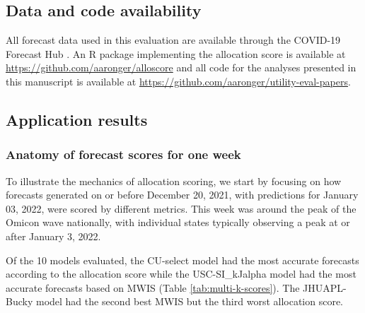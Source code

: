 \documentclass{article}\usepackage[]{graphicx}\usepackage[]{xcolor}
\begin{document}
\subsection{Data and code availability}

All forecast data used in this evaluation are available through the COVID-19 Forecast Hub \citep{cramer_reichlabcovid19-forecast-hub_2021}. An R package implementing the allocation score is available at \url{https://github.com/aaronger/alloscore} and all code for the analyses presented in this manuscript is available at \url{https://github.com/aaronger/utility-eval-papers}.

\subsection{Application results}




\subsubsection{Anatomy of forecast scores for one week}

To illustrate the mechanics of allocation scoring, we start by focusing on how forecasts generated on or before December 20, 2021, with predictions for January 03, 2022, were scored by different metrics.
This week was around the peak of the Omicon wave nationally, with individual states typically observing a peak at or after January 3, 2022.

Of the 10 models evaluated, the CU-select model had the most accurate forecasts according to the allocation score while the USC-SI\_kJalpha model had the most accurate forecasts based on MWIS (Table \ref{tab:multi-k-scores}).
The JHUAPL-Bucky model had the second best MWIS but the third worst allocation score.
\end{document}

